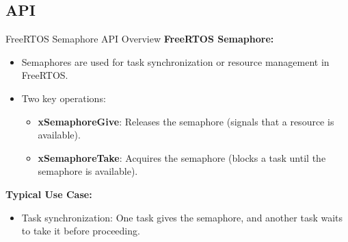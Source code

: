 \documentclass[10pt]{beamer}
\begin{document}
\subsection{API}
\begin{frame}{FreeRTOS Semaphore API Overview}
    \textbf{FreeRTOS Semaphore:}
    \begin{itemize}
        \item Semaphores are used for task synchronization or resource management in FreeRTOS.
        \item Two key operations:
        \begin{itemize}
            \item \textbf{xSemaphoreGive}: Releases the semaphore (signals that a resource is available).
            \item \textbf{xSemaphoreTake}: Acquires the semaphore (blocks a task until the semaphore is available).
        \end{itemize}
    \end{itemize}
    \vspace{0.5cm}
    \textbf{Typical Use Case:}
    \begin{itemize}
        \item Task synchronization: One task gives the semaphore, and another task waits to take it before proceeding.
    \end{itemize}
    
\end{frame}
\end{document}
